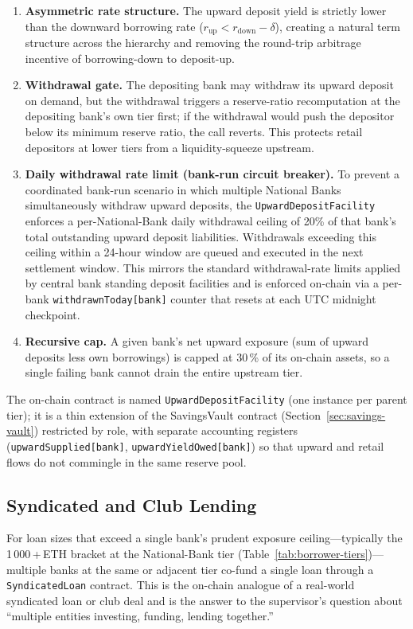 \documentclass[12pt,a4paper]{report}
\begin{document}
\begin{enumerate}[noitemsep]
\item \textbf{Asymmetric rate structure.} The upward deposit yield is strictly lower than the downward borrowing rate ($r_{\text{up}} < r_{\text{down}} - \delta$), creating a natural term structure across the hierarchy and removing the round-trip arbitrage incentive of borrowing-down to deposit-up.
\item \textbf{Withdrawal gate.} The depositing bank may withdraw its upward deposit on demand, but the withdrawal triggers a reserve-ratio recomputation at the depositing bank's own tier first; if the withdrawal would push the depositor below its minimum reserve ratio, the call reverts. This protects retail depositors at lower tiers from a liquidity-squeeze upstream.
\item \textbf{Daily withdrawal rate limit (bank-run circuit breaker).} To prevent a coordinated bank-run scenario in which multiple National Banks simultaneously withdraw upward deposits, the \texttt{UpwardDepositFacility} enforces a per-National-Bank daily withdrawal ceiling of 20\% of that bank's total outstanding upward deposit liabilities. Withdrawals exceeding this ceiling within a 24-hour window are queued and executed in the next settlement window. This mirrors the standard withdrawal-rate limits applied by central bank standing deposit facilities and is enforced on-chain via a per-bank \texttt{withdrawnToday[bank]} counter that resets at each UTC midnight checkpoint.
\item \textbf{Recursive cap.} A given bank's net upward exposure (sum of upward deposits less own borrowings) is capped at 30\,\% of its on-chain assets, so a single failing bank cannot drain the entire upstream tier.
\end{enumerate}

The on-chain contract is named \texttt{UpwardDepositFacility} (one instance per parent tier); it is a thin extension of the SavingsVault contract (Section~\ref{sec:savings-vault}) restricted by role, with separate accounting registers (\texttt{upwardSupplied[bank]}, \texttt{upwardYieldOwed[bank]}) so that upward and retail flows do not commingle in the same reserve pool.

\subsection{Syndicated and Club Lending}
\label{sec:syndicated-lending}

For loan sizes that exceed a single bank's prudent exposure ceiling---typically the 1\,000\,+\,ETH bracket at the National-Bank tier (Table~\ref{tab:borrower-tiers})---multiple banks at the same or adjacent tier co-fund a single loan through a \texttt{SyndicatedLoan} contract. This is the on-chain analogue of a real-world syndicated loan or club deal and is the answer to the supervisor's question about ``multiple entities investing, funding, lending together.''
\end{document}
